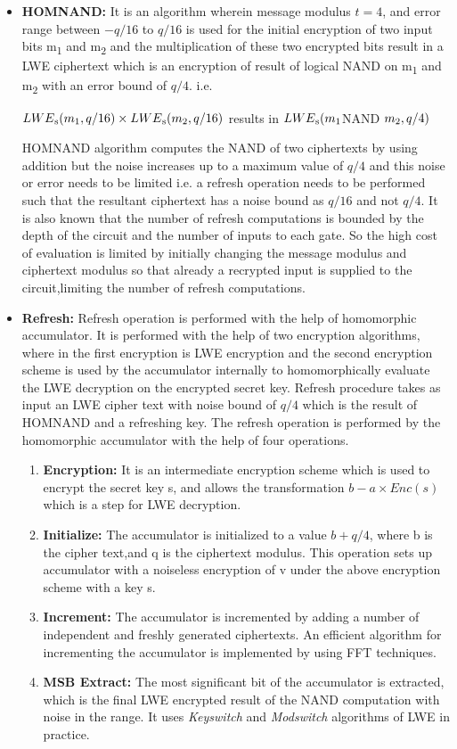 \begin{itemize}
\item
\textbf{HOMNAND:} It is an algorithm wherein message modulus $t=4$, and error range between $-q/16$ to $q/16$ is used for the initial encryption of two input bits m\textsubscript{1} and  m\textsubscript{2} and the multiplication of these two encrypted bits result in a LWE ciphertext which is an encryption of result of logical NAND on m\textsubscript{1} and  m\textsubscript{2} with an error bound of $q/4$.
i.e.

$LWE\textsubscript{s}(m\textsubscript{1},q/16)\times LWE\textsubscript{s}(m\textsubscript{2},q/16)$ results in $LWE\textsubscript{s}(m\textsubscript{1}$NAND $m\textsubscript{2},q/4)$

\vspace{0.25cm}
\noindent HOMNAND algorithm computes the NAND of two ciphertexts by using addition but the noise increases up to a maximum value of $q/4$ and this noise or error needs to be limited i.e. a refresh operation needs to be performed such that the resultant ciphertext has a noise bound as $q/16$ and not $q/4$. It is also known that the number of refresh computations is bounded by the depth of the circuit and the number of inputs to each gate. So the high cost of evaluation is limited by initially changing the message modulus and ciphertext modulus so that already a recrypted input is supplied to the circuit,limiting the number of refresh computations. 
\item
\textbf{Refresh:} Refresh operation is performed with the help of homomorphic accumulator. It is performed with the help of two encryption algorithms, where in the first encryption is LWE encryption and the second encryption scheme is used by the accumulator internally to homomorphically evaluate the LWE decryption on the encrypted secret key.
Refresh procedure takes as input an LWE cipher text with noise bound of $q/4$ which is the result of HOMNAND and a refreshing key. The refresh operation is performed by the homomorphic accumulator with the help of four operations.
\begin{enumerate}
\item
\textbf{Encryption:} It is an intermediate encryption scheme which is used to encrypt the secret key s, and allows the transformation $b-a\times Enc(s)$ which is a step for LWE decryption.
\item
\textbf{Initialize:} The accumulator is initialized to a value $b+q/4$, where b is the cipher text,and q is the ciphertext modulus. This operation sets up accumulator with a noiseless encryption of v under the above encryption scheme with a key s.
\item
\textbf{Increment:} The accumulator is incremented by adding a number of independent and freshly generated ciphertexts. An efficient algorithm for incrementing the accumulator is implemented by using FFT techniques.
\item
\textbf{MSB Extract:} The most significant bit of the accumulator is extracted, which is the final LWE encrypted result of the NAND computation with noise in the range. It uses \textit{Keyswitch} and \textit{Modswitch} algorithms of LWE in practice.
\end{enumerate}
\end{itemize}
